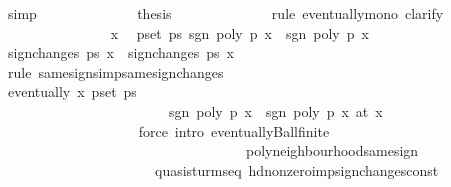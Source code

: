 \begin{isabellebody}
\ simp\isanewline
\ \ \ \ \ \ \ \ \ \ \ \ \isamarkupfalse%
\ {\isacharquery}thesis\isanewline
\ \ \ \ \ \ \ \ \ \ \ \ \isamarkupfalse%
\ {\isacharparenleft}rule\ eventually{\isacharunderscore}mono{\isacharcomma}\ clarify{\isacharparenright}\isanewline
\ \ \ \ \ \ \ \ \ \ \ \ \ \ \isamarkupfalse%
\ x\ \isamarkupfalse%
\ {\isachardoublequoteopen}{\isasymforall}p{\isasymin}set\ ps{\isacharprime}{\isachardot}\ sgn\ {\isacharparenleft}poly\ p\ x{\isacharparenright}\ {\isacharequal}\ sgn\ {\isacharparenleft}poly\ p\ x\isanewline
\ \ \ \ \ \ \ \ \ \ \ \ \ \ \isamarkupfalse%
\ {\isachardoublequoteopen}sign{\isacharunderscore}changes\ ps{\isacharprime}\ x\ {\isacharequal}\ sign{\isacharunderscore}changes\ ps{\isacharprime}\ x\isanewline
\ \ \ \ \ \ \ \ \ \ \ \ \ \ \ \ \ \ \isamarkupfalse%
\ {\isacharparenleft}rule\ same{\isacharunderscore}signs{\isacharunderscore}imp{\isacharunderscore}same{\isacharunderscore}sign{\isacharunderscore}changes{\isacharprime}{\isacharparenright}\isanewline
\ \ \ \ \ \ \ \ \ \ \ \ \isamarkupfalse%
\isanewline
\ \ \ \ \ \ \ \ \ \ \ \ \ \ \isamarkupfalse%
\ {\isachardoublequoteopen}eventually\ {\isacharparenleft}{\isasymlambda}x{\isachardot}\ {\isasymforall}p{\isasymin}set\ ps{\isacharprime}{\isachardot}\ \isanewline
\ \ \ \ \ \ \ \ \ \ \ \ \ \ \ \ \ \ \ \ \ \ \ \ sgn\ {\isacharparenleft}poly\ p\ x{\isacharparenright}\ {\isacharequal}\ sgn\ {\isacharparenleft}poly\ p\ x\ {\isacharparenleft}at\ x\isanewline
\ \ \ \ \ \ \ \ \ \ \ \ \ \ \ \ \ \ \isamarkupfalse%
\ {\isacharparenleft}force\ intro{\isacharcolon}\ eventually{\isacharunderscore}Ball{\isacharunderscore}finite\ \isanewline
\ \ \ \ \ \ \ \ \ \ \ \ \ \ \ \ \ \ \ \ \ \ \ \ \ \ \ \ \ \ \ \ \ \ \ poly{\isacharunderscore}neighbourhood{\isacharunderscore}same{\isacharunderscore}sign{\isacharparenright}\isanewline
\ \ \ \ \ \ \ \ \ \ \ \ \isamarkupfalse%
\isanewline
\ \ \ \ \isamarkupfalse%
\isanewline
\ \ \isamarkupfalse%
\isanewline
{}\isamarkupfalse%
%
\endisatagproof
{\isafoldproof}%
%
\isadelimproof
\isanewline
%
\endisadelimproof
\isanewline
\isanewline
{}\isamarkupfalse%
\ {\isacharparenleft}\ quasi{\isacharunderscore}sturm{\isacharunderscore}seq{\isacharparenright}\ hd{\isacharunderscore}nonzero{\isacharunderscore}imp{\isacharunderscore}sign{\isacharunderscore}changes{\isacharunderscore}const{\isacharcolon}\isanewline

\end{isabellebody}
